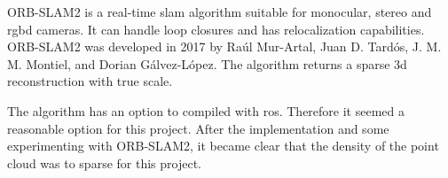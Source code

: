 ORB\hyp{}SLAM2 is a real\hyp{}time \acs{slam} algorithm suitable for monocular, stereo and \acs{rgbd} cameras. It can handle loop closures and has relocalization capabilities. ORB-SLAM2 was developed in 2017 by Ra\'ul Mur\hyp{}Artal, Juan D. Tard\'os, J. M. M. Montiel, and Dorian G\'alvez\hyp{}L\'opez. The algorithm returns a sparse \acs{3d} reconstruction with true scale. \cite{murORB2}

The algorithm has an option to compiled with \acs{ros}. Therefore it seemed a reasonable option for this project. After the implementation and some experimenting with ORB\hyp{}SLAM2, it became clear that the density of the point cloud was to sparse for this project.